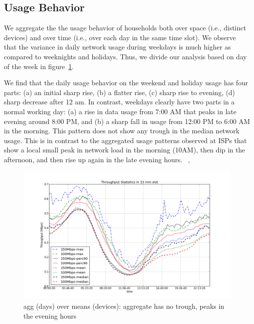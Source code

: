 \subsection{Usage Behavior}
\label{subsec:behavior}

We aggregate the the usage behavior of households both over space (i.e., distinct devices) and over time (i.e., over each day in the same time slot). We observe that the variance in daily network usage during weekdays is much higher as compared to weeknights and holidays. Thus, we divide our analysis based on day of the week in figure~\ref{fig:TS-data-rate-daily}. 

We find that the daily usage behavior on the weekend and holiday usage has four parts: (a) an initial sharp rise, (b) a flatter rise, (c) sharp rise to evening, (d) sharp decrease after 12 am.
In contrast, weekdays clearly have two parts in a normal working day: (a) a rise in data usage from 7:00 AM that peaks in late evening around 8:00 PM, and (b) a sharp fall in usage from 12:00 PM to 6:00 AM in the morning. This pattern does not show any trough in the median network usage. This is in contrast to the aggregated usage patterns observed at ISPs that show a local small peak in network load in the morning (10AM), then dip in the afternoon, and then rise up again in the late evening hours. ~\cite{sandvine2014report1}, 

\begin{figure}[ht!]
\begin{minipage}{\linewidth}
  \centering
  \includegraphics[width=\linewidth]{figures/describe-total-throughput-per-day[replace].png}
  \caption{agg (days) over means (devices): aggregate has no trough, peaks in the evening hours}
  \label{fig:TS-data-rate-daily}
\end{minipage}
\end{figure}

